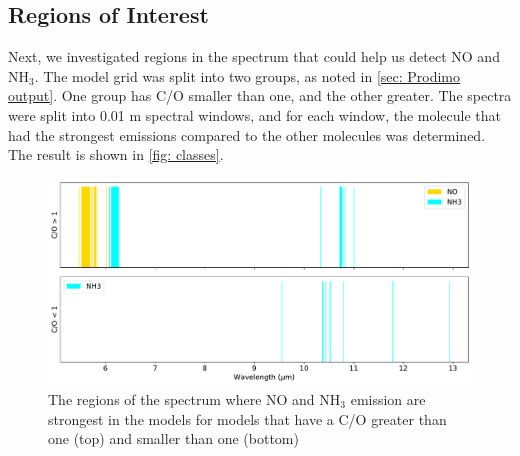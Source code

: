 \documentclass[oneside, single, authoryear, semicolon, 12pt]{lion-msc}
\newcommand{\4}{$_4$}
\newcommand{\3}{$_3$}
\newcommand{\2}{$_2$}
\begin{document}
\subsection{Regions of Interest}
Next, we investigated regions in the spectrum that could help us detect NO and NH\3. The model grid was split into two groups, as noted in \autoref{sec: Prodimo output}. One group has C/O smaller than one, and the other greater. The spectra were split into 0.01 \textmu m spectral windows, and for each window, the molecule that had the strongest emissions compared to the other molecules was determined. The result is shown in \autoref{fig: classes}.



\begin{figure}[H]
    \centering
    \includegraphics[width=\linewidth]{Figures/ClassificationCO.pdf}
    \caption{The regions of the spectrum where NO and NH\3 emission are strongest in the models for models that have a C/O greater than one (top) and smaller than one (bottom)}
    \label{fig: classes}
\end{figure}
\end{document}

